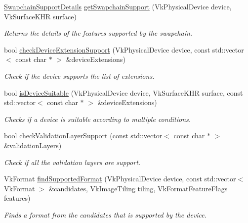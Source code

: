 \begin{DoxyCompactItemize}
\hyperlink{structblaze_1_1util_1_1SwapchainSupportDetails}{Swapchain\+Support\+Details} \hyperlink{namespaceblaze_1_1util_a11dc99b58ff4a58b45175e005acbf406}{get\+Swapchain\+Support} (Vk\+Physical\+Device device, Vk\+Surface\+K\+HR surface)
\begin{DoxyCompactList}\small\item\em Returns the details of the features supported by the swapchain. \end{DoxyCompactList}\item 
bool \hyperlink{namespaceblaze_1_1util_aba6d1d4fa38d54444eb861c08919af34}{check\+Device\+Extension\+Support} (Vk\+Physical\+Device device, const std\+::vector$<$ const char $\ast$ $>$ \&device\+Extensions)
\begin{DoxyCompactList}\small\item\em Check if the device supports the list of extensions. \end{DoxyCompactList}\item 
bool \hyperlink{namespaceblaze_1_1util_a084200da1446d1dabeb9b83eaf43dcb8}{is\+Device\+Suitable} (Vk\+Physical\+Device device, Vk\+Surface\+K\+HR surface, const std\+::vector$<$ const char $\ast$ $>$ \&device\+Extensions)
\begin{DoxyCompactList}\small\item\em Checks if a device is suitable according to multiple conditions. \end{DoxyCompactList}\item 
bool \hyperlink{namespaceblaze_1_1util_a84a8343ca8455d39e1d2cfacf1c23ac2}{check\+Validation\+Layer\+Support} (const std\+::vector$<$ const char $\ast$ $>$ \&validation\+Layers)
\begin{DoxyCompactList}\small\item\em Check if all the validation layers are support. \end{DoxyCompactList}\item 
Vk\+Format \hyperlink{namespaceblaze_1_1util_ab5bcba41a9c9ae6ea4b4673a64f67a23}{find\+Supported\+Format} (Vk\+Physical\+Device device, const std\+::vector$<$ Vk\+Format $>$ \&candidates, Vk\+Image\+Tiling tiling, Vk\+Format\+Feature\+Flags features)
\begin{DoxyCompactList}\small\item\em Finds a format from the candidates that is supported by the device. \end{DoxyCompactList}\item 
\mbox{\label{namespaceblaze_1_1util_ae038f8e92528d9414b1b885c07ed4319}} 

\end{DoxyCompactItemize}
